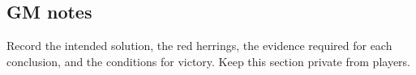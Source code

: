 
\subsection{GM notes}

Record the intended solution, the red herrings, the evidence required for each conclusion, and the conditions for victory. Keep this section private from players.